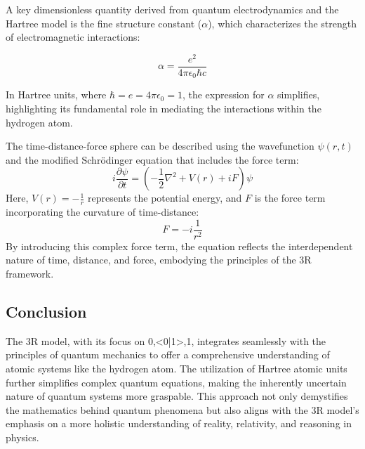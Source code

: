 \documentclass[12pt]{article}
\begin{document}
A key dimensionless quantity derived from quantum electrodynamics and the Hartree model is the fine structure constant ($\alpha$), which characterizes the strength of electromagnetic interactions:

\begin{equation}
    \alpha = \frac{e^2}{4\pi \epsilon_0 \hbar c}
\end{equation}

In Hartree units, where $\hbar = e = 4\pi\epsilon_0 = 1$, the expression for $\alpha$ simplifies, highlighting its fundamental role in mediating the interactions within the hydrogen atom.

The time-distance-force sphere can be described using the wavefunction $\psi(r, t)$ and the modified Schrödinger equation that includes the force term:
\[
    i \frac{\partial \psi}{\partial t} = \left( -\frac{1}{2} \nabla^2 + V(r) + iF \right) \psi
\]
Here, $V(r) = -\frac{1}{r}$ represents the potential energy, and $F$ is the force term incorporating the curvature of time-distance:
\[
    F = -i \frac{1}{r^2}
\]
By introducing this complex force term, the equation reflects the interdependent nature of time, distance, and force, embodying the principles of the 3R framework.

\subsection*{Conclusion}

The 3R model, with its focus on {0,<0|1>,1}, integrates seamlessly with the principles of quantum mechanics to offer a comprehensive understanding of atomic systems like the hydrogen atom. The utilization of Hartree atomic units further simplifies complex quantum equations, making the inherently uncertain nature of quantum systems more graspable. This approach not only demystifies the mathematics behind quantum phenomena but also aligns with the 3R model's emphasis on a more holistic understanding of reality, relativity, and reasoning in physics.
\end{document}
